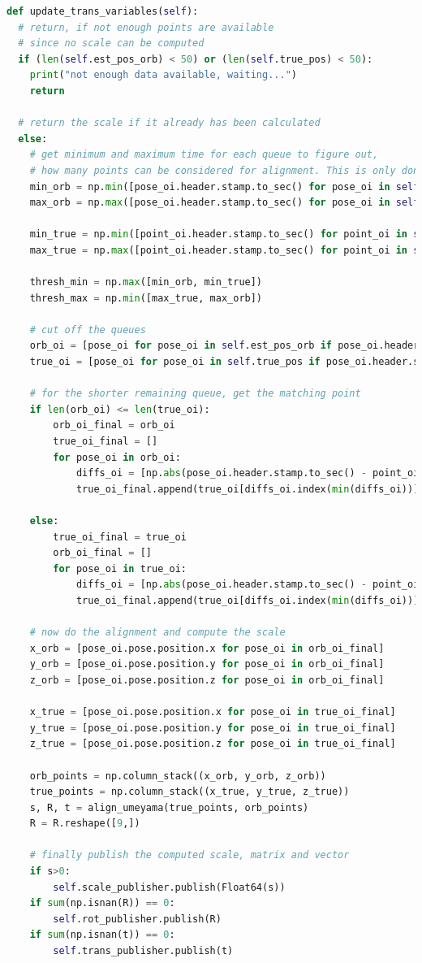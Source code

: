 \begin{lstlisting}[language=python, caption=Main part of the scale estimation node, label=lst:scaleup]
def update_trans_variables(self):
  # return, if not enough points are available
  # since no scale can be computed
  if (len(self.est_pos_orb) < 50) or (len(self.true_pos) < 50):
	print("not enough data available, waiting...")
	return

  # return the scale if it already has been calculated    
  else:
    # get minimum and maximum time for each queue to figure out, 
    # how many points can be considered for alignment. This is only done once!
    min_orb = np.min([pose_oi.header.stamp.to_sec() for pose_oi in self.est_pos_orb])
	max_orb = np.max([pose_oi.header.stamp.to_sec() for pose_oi in self.est_pos_orb])

    min_true = np.min([point_oi.header.stamp.to_sec() for point_oi in self.true_pos])
	max_true = np.max([point_oi.header.stamp.to_sec() for point_oi in self.true_pos])

    thresh_min = np.max([min_orb, min_true])
    thresh_max = np.min([max_true, max_orb])

    # cut off the queues
    orb_oi = [pose_oi for pose_oi in self.est_pos_orb if pose_oi.header.stamp.to_sec() > thresh_min]
    true_oi = [pose_oi for pose_oi in self.true_pos if pose_oi.header.stamp.to_sec() > thresh_min]

    # for the shorter remaining queue, get the matching point
    if len(orb_oi) <= len(true_oi): 
	    orb_oi_final = orb_oi
	    true_oi_final = []
        for pose_oi in orb_oi: 
            diffs_oi = [np.abs(pose_oi.header.stamp.to_sec() - point_oi.header.stamp.to_sec()) for point_oi in true_oi]
            true_oi_final.append(true_oi[diffs_oi.index(min(diffs_oi))])

	else:
		true_oi_final = true_oi
		orb_oi_final = []
		for pose_oi in true_oi: 
			diffs_oi = [np.abs(pose_oi.header.stamp.to_sec() - point_oi.header.stamp.to_sec()) for point_oi in orb_oi]
			true_oi_final.append(true_oi[diffs_oi.index(min(diffs_oi))])

	# now do the alignment and compute the scale
	x_orb = [pose_oi.pose.position.x for pose_oi in orb_oi_final]
	y_orb = [pose_oi.pose.position.y for pose_oi in orb_oi_final]
	z_orb = [pose_oi.pose.position.z for pose_oi in orb_oi_final]

	x_true = [pose_oi.pose.position.x for pose_oi in true_oi_final]
	y_true = [pose_oi.pose.position.y for pose_oi in true_oi_final]
	z_true = [pose_oi.pose.position.z for pose_oi in true_oi_final]
		
	orb_points = np.column_stack((x_orb, y_orb, z_orb))
	true_points = np.column_stack((x_true, y_true, z_true))
	s, R, t = align_umeyama(true_points, orb_points)
	R = R.reshape([9,])

	# finally publish the computed scale, matrix and vector
	if s>0:
		self.scale_publisher.publish(Float64(s))
	if sum(np.isnan(R)) == 0:
		self.rot_publisher.publish(R)
	if sum(np.isnan(t)) == 0:
		self.trans_publisher.publish(t)
\end{lstlisting}
	
